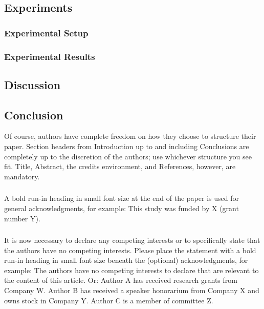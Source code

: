 \documentclass[
  runningheads]{llncs}
\begin{document}
\subsection{Experiments}\label{experiments}

\subsubsection{Experimental Setup}\label{experimental-setup}

\subsubsection{Experimental Results}\label{experimental-results}

\subsection{Discussion}\label{discussion}

\subsection{Conclusion}\label{conclusion}

Of course, authors have complete freedom on how they choose to structure
their paper. Section headers from Introduction up to and including
Conclusions are completely up to the discretion of the authors; use
whichever structure you see fit. Title, Abstract, the credits
environment, and References, however, are mandatory.

\begin{credits}
\subsubsection{\ackname} A bold run-in heading in small font size at the end of the paper is
used for general acknowledgments, for example: This study was funded
by X (grant number Y).

\subsubsection{\discintname}
It is now necessary to declare any competing interests or to specifically
state that the authors have no competing interests. Please place the
statement with a bold run-in heading in small font size beneath the
(optional) acknowledgments,
for example: The authors have no competing interests to declare that are
relevant to the content of this article. Or: Author A has received research
grants from Company W. Author B has received a speaker honorarium from
Company X and owns stock in Company Y. Author C is a member of committee Z.
\end{credits}



\end{document}

